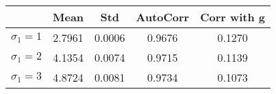 \begin{tiny}\begin{tabular}{|l|c|c|c|c|}
\hline
&\textbf{Mean}&\textbf{Std}&\textbf{AutoCorr}&\textbf{Corr with g}\\\hline
\textbf{$\sigma_1=1$}&2.7961&0.0006&0.9676&0.1270\\\hline
\textbf{$\sigma_1=2$}&4.1354&0.0074&0.9715&0.1139\\\hline
\textbf{$\sigma_1=3$}&4.8724&0.0081&0.9734&0.1073\\\hline
\end{tabular}
\end{tiny}